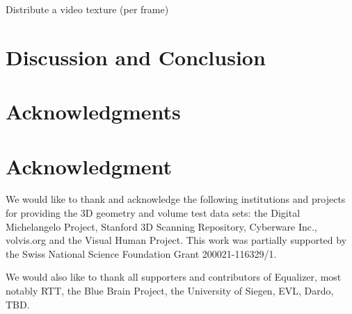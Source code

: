 \documentclass[10pt,journal,compsoc]{IEEEtran}
\begin{document}
Distribute a video texture (per frame)

\section{Discussion and Conclusion}
\label{sec:conclusions}


\appendices
\ifCLASSOPTIONcompsoc
  \section*{Acknowledgments}
\else
  \section*{Acknowledgment}
\fi
We would like to thank and acknowledge the following institutions and projects
for providing the 3D geometry and volume test data sets: the Digital
Michelangelo Project, Stanford 3D Scanning Repository, Cyberware Inc.,
volvis.org and the Visual Human Project.  This work was partially supported by
the Swiss National Science Foundation Grant 200021-116329/1.

We would also like to thank all supporters and contributors of Equalizer, most
notably RTT, the Blue Brain Project, the University of Siegen, EVL, Dardo, TBD.


%
\end{document}

